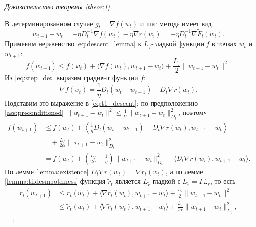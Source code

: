 \begin{proof}[Доказательство теоремы \ref{theor:1}]
\label{proof:theorem1}

В детерминированном случае $g_t = \nabla f(w_t)$ и шаг метода имеет вид
\begin{equation}
\label{eq:step_det}
w_{t+1} - w_t = -\eta D_t^{-1} \nabla f(w_t) - \eta \nabla r(w_t) = -\eta D_t^{-1} \nabla \widetilde{F}_t(w_t).
\end{equation}
Применим неравенство \eqref{eq:descent_lemma} к $L_f$-гладкой функции $f$ в точках $w_t$ и $w_{t+1}$:
\begin{equation} \label{eq:t1_descent}
    f(w_{t+1}) \leq f(w_t) + \langle \nabla f(w_t), w_{t+1} - w_t \rangle + \frac{L_f}{2}\|w_{t+1} - w_t \|^2.
\end{equation}
Из \eqref{eq:step_det} выразим градиент функции $f$:
\begin{equation*}
\nabla f(w_t) = \frac{1}{\eta} D_t(w_t - w_{t+1}) - D_t \nabla r(w_t).
\end{equation*}
Подставим это выражение в \eqref{eq:t1_descent}; по предположению \ref{ass:preconditioned} $\|w_{t+1} - w_t\|^2 \le \frac{1}{\alpha}\|w_{t+1} - w_t\|^2_{D_t}$, поэтому
\begin{equation*}
\begin{split}
    f(w_{t+1}) &\leq f(w_t) + \left\langle \frac{1}{\eta}D_t(w_t - w_{t+1}) - D_t\nabla r(w_t), w_{t+1} - w_t \right\rangle \\
    &\quad + \frac{L_f}{2 \alpha} \|w_{t+1} - w_t\|_{D_t}^2 \\
    &= f(w_t) + \left(\frac{L_f}{2 \alpha} - \frac{1}{\eta} \right) \|w_{t+1} - w_t\|_{D_t}^2 - \langle D_t \nabla r(w_t), w_{t+1} - w_t \rangle.
\end{split}
\end{equation*}
По лемме \ref{lemma:existence} $D_t \nabla r(w_t) = \nabla \widetilde{r}_t(w_t)$, а по лемме \ref{lemma:tildesmoothness} функция $\widetilde{r}_t$ является $L_{\tilde r}$-гладкой с $L_{\tilde r} = \Gamma L_r$, то есть
\begin{equation*}
\begin{split}
    \widetilde{r}_t(w_{t+1}) &\leq \widetilde{r}_t(w_t) + \langle \nabla \widetilde{r}_t(w_t), w_{t+1} - w_t \rangle + \frac{L_{\tilde{r}}}{2} \|w_{t+1} - w_t\|^2 \\
    &\le \widetilde{r}_t(w_t) + \langle \nabla \widetilde{r}_t(w_t), w_{t+1} - w_t \rangle + \frac{L_{\tilde{r}}}{2\alpha} \|w_{t+1} - w_t\|_{D_t}^2,
\end{split}
\end{equation*}

\end{proof}
